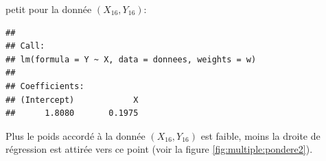 \begin{solution}{3.17}
\begin{enumerate}
      petit pour la donnée $(X_{16}, Y_{16})$:
\begin{knitrout}
\color{fgcolor}\begin{kframe}
\begin{alltt}
\hlstd{w[}\hlstd{]} \hlkwb{<-} 
 \hlkwb{<-}   
\end{alltt}
\begin{verbatim}
##
## Call:
## lm(formula = Y ~ X, data = donnees, weights = w)
##
## Coefficients:
## (Intercept)            X
##      1.8080       0.1975
\end{verbatim}
\end{kframe}
\end{knitrout}
      Plus le poids accordé à la donnée $(X_{16}, Y_{16})$ est faible,
      moins la droite de régression est attirée vers ce point (voir la
      figure \ref{fig:multiple:pondere2}).
      \begin{figure}[t]
        \centering
\begin{knitrout}
\color{fgcolor}\begin{kframe}
\begin{alltt}
 \hlopt{~}   
\hlopt{$}\hlstd{X[}\hlstd{], donnees}\hlopt{$}\hlstd{Y[}\hlstd{],}  \hlstd{=} \hlstd{)}
  \hlstd{=} \hlstd{,}  \hlstd{=} \hlstd{)}
  \hlstd{=} \hlstd{,}  \hlstd{=} \hlstd{)}
  \hlstd{=} \hlstd{,}  \hlstd{=} \hlstd{)}
\hlstd{(}\hlstd{,} \hlstd{,}  \hlstd{=} \hlstd{(}\hlstd{,} \hlstd{,} \hlstd{),}
        \hlstd{=} \hlstd{,}  \hlstd{=} \hlopt{:}\hlstd{)}
\end{alltt}
\end{kframe}

\end{knitrout}
\end{figure}
\end{enumerate}
\end{solution}
